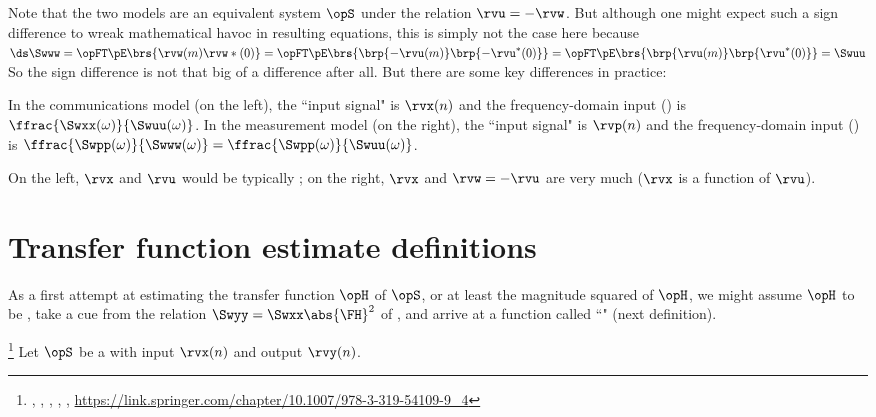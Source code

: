 Note that the two models are an equivalent system $\opS$ under the relation $\rvu=-\rvw$.
But although one might expect such a sign difference to wreak mathematical havoc in resulting equations,
this is simply not the case here because
\\\indentx$\ds\Swww = \opFT\pE\brs{\rvw(m)\rvw\ast(0)}
                    = \opFT\pE\brs{\brp{-\rvu(m)}\brp{-\rvu^\ast(0)}}
                    = \opFT\pE\brs{\brp{\rvu(m)}\brp{\rvu^\ast(0)}}
                    = \Swuu$
\\
So the sign difference is not that big of a difference after all.
But there are some key differences in practice:
\begin{liste}
  \item In the communications model (on the left), the ``input signal" is $\rvx(n)$
      and the frequency-domain input  () is $\ffrac{\Swxx(\omega)}{\Swuu(\omega)}$.
      In the measurement model (on the right), the ``input signal" is $\rvp(n)$
      and the frequency-domain input  () is 
         $\ffrac{\Swpp(\omega)}{\Swww(\omega)} = \ffrac{\Swpp(\omega)}{\Swuu(\omega)}$.

  \item On the left, $\rvx$ and $\rvu$ would be typically ;
        on the right, $\rvx$ and $\rvw=-\rvu$ are very much  ($\rvx$ is a function of $\rvu$).
\end{liste}

\section{Transfer function estimate definitions}
As a first attempt at estimating the transfer function $\opH$ of $\opS$,
or at least the magnitude squared of $\opH$,
we might assume $\opH$ to be , take a cue from the relation
$\Swyy=\Swxx\abs{\FH}^2$ of ,
and arrive at a function called ``"
(next definition).
\begin{definition}
\footnote{
  ,
  ,
  ,
  ,
  ,
  \url{https://link.springer.com/chapter/10.1007/978-3-319-54109-9_4}
  }
\label{def:Txy}
Let $\opS$ be a  with input $\rvx(n)$ and output $\rvy(n)$.
\end{definition}

